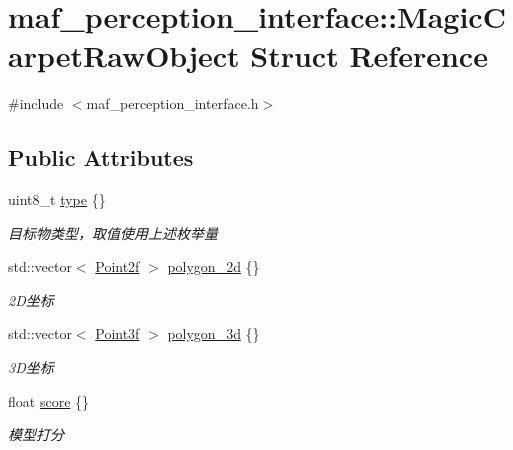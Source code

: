 \hypertarget{structmaf__perception__interface_1_1MagicCarpetRawObject}{}\section{maf\+\_\+perception\+\_\+interface\+:\+:Magic\+Carpet\+Raw\+Object Struct Reference}
\label{structmaf__perception__interface_1_1MagicCarpetRawObject}


{\ttfamily \#include $<$maf\+\_\+perception\+\_\+interface.\+h$>$}

\subsection*{Public Attributes}
\begin{DoxyCompactItemize}
\item 
uint8\+\_\+t \hyperlink{structmaf__perception__interface_1_1MagicCarpetRawObject_aeee95295ddd7bef4adab5d5007b36500}{type} \{\}
\begin{DoxyCompactList}\small\item\em 目标物类型，取值使用上述枚举量 \end{DoxyCompactList}\item 
std\+::vector$<$ \hyperlink{structmaf__perception__interface_1_1Point2f}{Point2f} $>$ \hyperlink{structmaf__perception__interface_1_1MagicCarpetRawObject_a3006a5a27ae9f48f7a499eca34862a92}{polygon\+\_\+2d} \{\}
\begin{DoxyCompactList}\small\item\em 2\+D坐标 \end{DoxyCompactList}\item 
std\+::vector$<$ \hyperlink{structmaf__perception__interface_1_1Point3f}{Point3f} $>$ \hyperlink{structmaf__perception__interface_1_1MagicCarpetRawObject_ab760c7baa8ea877d6b2c0ff4eab0ee0a}{polygon\+\_\+3d} \{\}
\begin{DoxyCompactList}\small\item\em 3\+D坐标 \end{DoxyCompactList}\item 
float \hyperlink{structmaf__perception__interface_1_1MagicCarpetRawObject_a4b6f5fd6345005cac47fe411b851b1e6}{score} \{\}
\begin{DoxyCompactList}\small\item\em 模型打分 \end{DoxyCompactList}\end{DoxyCompactItemize}


